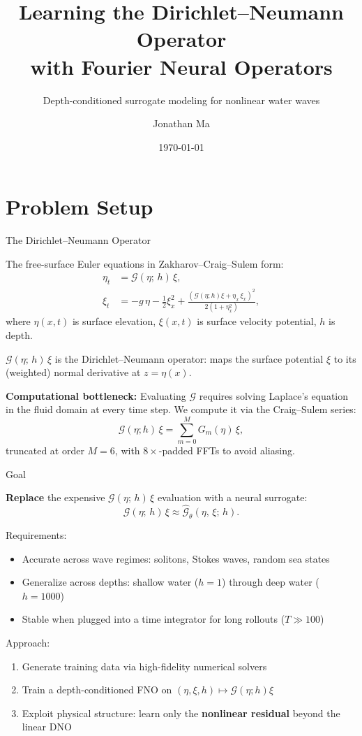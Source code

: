 \documentclass[aspectratio=169,11pt]{beamer}
\title{Learning the Dirichlet--Neumann Operator\\with Fourier Neural Operators}
\subtitle{Depth-conditioned surrogate modeling for nonlinear water waves}
\date{\today}
\author{Jonathan Ma}
\newcommand{\Gop}{\mathcal{G}}
\begin{document}
\begin{frame}
\titlepage
\end{frame}

\section{Problem Setup}

\begin{frame}{The Dirichlet--Neumann Operator}

The free-surface Euler equations in Zakharov--Craig--Sulem form:
\begin{align}
  \eta_t &= \Gop(\eta;\,h)\,\xi, \label{eq:zt1}\\
  \xi_t &= -g\,\eta - \tfrac{1}{2}\xi_x^2
    + \frac{(\Gop(\eta;h)\xi + \eta_x\,\xi_x)^2}{2(1+\eta_x^2)}, \label{eq:zt2}
\end{align}
where $\eta(x,t)$ is surface elevation, $\xi(x,t)$ is surface velocity potential, $h$ is depth.

\pause
\textbf{$\Gop(\eta;\,h)\,\xi$} is the Dirichlet--Neumann operator: maps the surface potential $\xi$ to its (weighted) normal derivative at $z = \eta(x)$.

\pause
\textbf{Computational bottleneck:} Evaluating $\Gop$ requires solving Laplace's equation in the fluid domain at every time step. We compute it via the Craig--Sulem series:
\[
  \Gop(\eta;h)\,\xi = \sum_{m=0}^{M} G_m(\eta)\,\xi,
\]
truncated at order $M = 6$, with $8\times$-padded FFTs to avoid aliasing.
\end{frame}

\begin{frame}{Goal}

\textbf{Replace} the expensive $\Gop(\eta;\,h)\,\xi$ evaluation with a neural surrogate:
\[
  \Gop(\eta;\,h)\,\xi \approx \hat{\Gop}_\theta(\eta,\,\xi;\, h).
\]

\pause
Requirements:
\begin{itemize}
  \item Accurate across wave regimes: solitons, Stokes waves, random sea states
  \item Generalize across depths: shallow water ($h = 1$) through deep water ($h = 1000$)
  \item Stable when plugged into a time integrator for long rollouts ($T \gg 100$)
\end{itemize}

\pause
Approach:
\begin{enumerate}
  \item Generate training data via high-fidelity numerical solvers
  \item Train a depth-conditioned FNO on $(\eta, \xi, h) \mapsto \Gop(\eta;h)\xi$
  \item Exploit physical structure: learn only the \textbf{nonlinear residual} beyond the linear DNO
\end{enumerate}
\end{frame}
\end{document}
